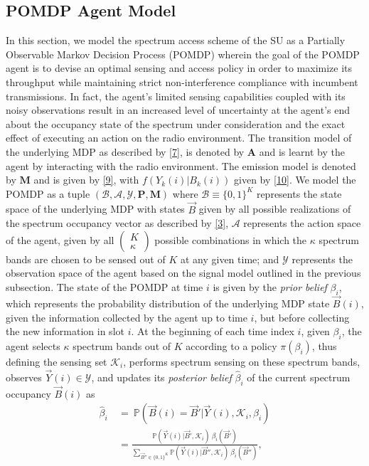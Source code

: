 \documentclass[10pt,twocolumn]{IEEEtran}
\begin{document}
\subsection{POMDP Agent Model}
In this section, we model the spectrum access scheme of the SU as a Partially Observable Markov Decision Process (POMDP) wherein the goal of the POMDP agent is to devise an optimal sensing and access policy in order to maximize its throughput while maintaining strict non-interference compliance with incumbent transmissions. In fact, the agent's limited sensing capabilities coupled with its noisy observations result in an increased level of uncertainty at the agent's end about the occupancy state of the spectrum under consideration and the exact effect of executing an action on the radio environment. The transition model of the underlying MDP as described by \eqref{7}, is denoted by $\mathbf{A}$ and is learnt by the agent by interacting with the radio environment. The emission model is denoted by $\mathbf{M}$ and is given by \eqref{9}, with $f(Y_k(i)|B_k(i))$ given by \eqref{10}. We model the POMDP as a tuple $(\mathcal B,\mathcal{A},\mathcal{Y},\mathbf{P},\mathbf{M})$ where $\mathcal{B}\equiv\{0,1\}^K$ represents the state space of the underlying MDP with states $\vec{B}$ given by all possible realizations of the spectrum occupancy vector as described by \eqref{3}, $\mathcal{A}$ represents the action space of the agent, given by all $\left(\begin{array}{c}K\\\kappa\end{array}\right)$ possible combinations in which the $\kappa$ spectrum bands are chosen to be sensed out of $K$ at any given time; and $\mathcal{Y}$ represents the observation space of the agent based on the signal model outlined in the previous subsection. 
The state of the POMDP at time $i$ is given by the \emph{prior belief} $\beta_i$, which represents the probability distribution of the underlying MDP state $\vec{B}(i)$, given the information collected by the agent up to time $i$, but before collecting the new information in slot $i$. At the beginning of each time index $i$, given $\beta_i$, the agent selects $\kappa$ spectrum bands out of $K$ according to a policy $\pi(\beta_i)$, thus defining the sensing set $\mathcal K_i$, performs spectrum sensing  on these spectrum bands, observes $\vec{Y}(i)\in \mathcal{Y}$, and updates its \emph{posterior belief} $\hat{\beta}_i$ of the current spectrum occupancy $\vec{B}(i)$ as 
\begin{align}\label{11}
\hat\beta_i\ &=\ \mathbb{P}(\vec{B}(i)=\vec{B}'|\vec{Y}(i),\mathcal K_i, \beta_i)\\&=
\nonumber
\frac{\mathbb{P}(\vec{Y}(i)|\vec{B}',\mathcal{K}_i)\ \beta_i(\vec{B}')}{
\sum_{\vec{B}''\in\{0,1\}^K}\mathbb{P}(\vec{Y}(i)|\vec{B}'',\mathcal{K}_i)\ \beta_i(\vec{B}'')},
\end{align}
\end{document}
